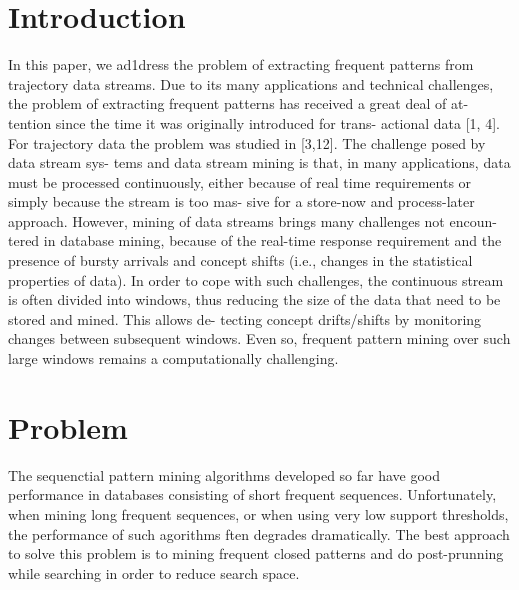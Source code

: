 \documentclass[journal]{IEEEtran}
\begin{document}
\section{Introduction}
In this paper, we ad1dress the problem of extracting frequent patterns from trajectory data streams. Due to its many applications and technical challenges, the problem of extracting frequent patterns has received a great deal of at- tention since the time it was originally introduced for trans- actional data [1, 4]. For trajectory data the problem was studied in [3,12]. The challenge posed by data stream sys- tems and data stream mining is that, in many applications, data must be processed continuously, either because of real time requirements or simply because the stream is too mas- sive for a store-now and process-later approach. However, mining of data streams brings many challenges not encoun- tered in database mining, because of the real-time response requirement and the presence of bursty arrivals and concept shifts (i.e., changes in the statistical properties of data). In order to cope with such challenges, the continuous stream is often divided into windows, thus reducing the size of the data that need to be stored and mined. This allows de- tecting concept drifts/shifts by monitoring changes between subsequent windows. Even so, frequent pattern mining over such large windows remains a computationally challenging.

\section{Problem}
The sequenctial pattern mining algorithms developed so far have good performance in databases consisting of short frequent sequences. Unfortunately, when mining long frequent sequences, or when using very low support thresholds, the performance of such agorithms ften degrades dramatically. The best approach to solve this problem is to mining frequent closed patterns and do post-prunning while searching in order to reduce search space.
\end{document}
